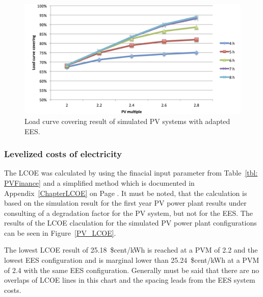 \begin{figure}[htbp]  
\centering
\includegraphics[width=1\linewidth]{FIG/PV_LCCF}
\caption[Load curve covering result of simulated PV systems with adapted EES.]{Load curve covering result of simulated PV systems with adapted EES.}\label{PV_LCCF}
\end{figure}
\subsubsection{Levelized costs of electricity}
The LCOE was calculated by using the finacial input parameter from Table~\ref{tbl: PVFinance} and a simplified method which is documented in Appendix~\ref{ChapterLCOE} on Page \pageref{ChapterLCOE}. It must be noted, that the calculation is based on the simulation result for the first year PV power plant results under consulting of a degradation factor for the PV system, but not for the EES. The results of the LCOE claculation for the simulated PV power plant configurations can be seen in Figure~\ref{PV_LCOE}. 

The lowest LCOE result of 25.18~\$cent/kWh is reached at a PVM of 2.2 and the lowest EES configuration and is marginal lower than  25.24~\$cent/kWh at a PVM of 2.4 with the same EES configuration. Generally must be said that there are no overlaps of LCOE lines in this chart and the spacing leads from the EES system costs.

